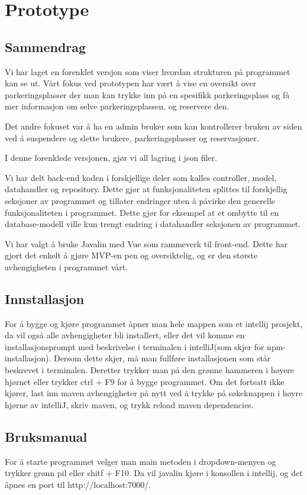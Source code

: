 \documentclass[12pt]{article}
\begin{document}
\section{Prototype}

    \subsection{Sammendrag}
    Vi har laget en forenklet versjon som viser hvordan strukturen på programmet kan se ut. Vårt fokus ved prototypen har vært å vise en oversikt over parkeringsplasser der man kan trykke inn på en spesifikk parkeringsplass og få mer informasjon om selve parkeringsplassen, og reservere den. 

    Det andre fokuset var å ha en admin bruker som kan kontrollerer bruken av siden ved å suspendere og slette brukere, parkeringsplasser og reservasjoner.

    I denne forenklede versjonen, gjør vi all lagring i json filer.

    Vi har delt back-end koden i forskjellige deler som kalles controller, model, datahandler og repository. Dette gjør at funksjonaliteten splittes til forskjellig seksjoner av programmet og tillater endringer uten å påvirke den generelle funksjonaliteten i programmet. Dette gjør for eksempel at et ombytte til en database-modell ville kun trengt endring i datahandler seksjonen av programmet.

    Vi har valgt å bruke Javalin med Vue som rammeverk til front-end. Dette har gjort det enkelt å gjøre MVP-en pen og oversiktelig, og er den største avhengigheten i programmet vårt.

    \subsection{Innstallasjon}
    For å bygge og kjøre programmet åpner man hele mappen som et intellij prosjekt, da vil også alle avhengigheter bli installert, eller det vil komme en installasjonsprompt med beskrivelse i terminalen i  intelliJ(som skjer for npm-installasjon). Dersom dette skjer, må man fullføre installasjonen som står beskrevet i terminalen. Deretter trykker man på den grønne hammeren i høyere hjørnet eller trykker ctrl + F9 for å bygge programmet. Om det fortsatt ikke kjører, last inn maven avhengigheter på nytt ved å trykke på søkeknappen i høyre hjørne av intelliJ, skriv maven, og trykk reload maven dependencies.

    \subsection{Bruksmanual}
    For å starte programmet velger man main metoden i dropdown-menyen og trykker grønn pil eller shitf + F10. Da vil javalin kjøre i konsollen i intellij, og det åpnes en port til http://localhost:7000/.
    
\end{document}
